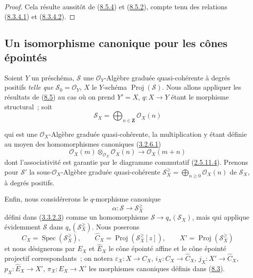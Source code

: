 \begin{proof}
Cela résulte aussitôt de (\hyperref[II.8.5.4-fr]{8.5.4}) et
(\hyperref[II.8.5.2-fr]{8.5.2}), compte tenu des relations
(\hyperref[II.8.3.4.1-fr]{8.3.4.1}) et
(\hyperref[II.8.3.4.2-fr]{8.3.4.2}).
\end{proof}

\subsection{Un isomorphisme canonique pour les cônes épointés}
\label{subsection:II.8.6-fr}

\begin{env}[8.6.1]
\label{II.8.6.1-fr}
Soient $Y$ un préschéma, $\mathcal{S}$ une $\mathcal{O}_Y$-Algèbre graduée
quasi-cohérente à degrés positifs \emph{telle que
$\mathcal{S}_0=\mathcal{O}_Y$}, $X$ le $Y$-schéma
$\operatorname{Proj}(\mathcal{S})$. Nous allons appliquer les résultats de
(\hyperref[subsection:II.8.5-fr]{8.5}) au cas où on prend $Y'=X$,
$q:X\to Y$ étant le morphisme structural~; soit
\begin{equation}
\label{II.8.6.1.1-fr}
  \mathcal{S}_X=\bigoplus_{n\in\mathbf{Z}}\mathcal{O}_X(n)
\tag{8.6.1.1}
\end{equation}

qui est une $\mathcal{O}_X$-Algèbre graduée quasi-cohérente, la multiplication
y étant définie au moyen des homomorphismes canoniques
(\hyperref[II.3.2.6.1-fr]{3.2.6.1})
\[
  \mathcal{O}_X(m)\otimes_{\mathcal{O}_X}\mathcal{O}_X(n)
  \to\mathcal{O}_X(m+n)
\]
dont l'associativité est garantie par le diagramme commutatif
(\hyperref[II.2.5.11.4-fr]{2.5.11.4}). Prenons pour $\mathcal{S}'$ la
sous-$\mathcal{O}_X$-Algèbre graduée quasi-cohérente
$\mathcal{S}_X^{\geq}=\bigoplus_{n\geq0}\mathcal{O}_X(n)$ de
$\mathcal{S}_X$, à degrés positifs.

Enfin, nous considérerons le $q$-morphisme canonique
\begin{equation}
\label{II.8.6.1.2-fr}
  \alpha:\mathcal{S}\to\mathcal{S}_X^{\geq}
\tag{8.6.1.2}
\end{equation}
défini dans (\hyperref[II.3.3.2.3-fr]{3.3.2.3}) comme un homomorphisme
$\mathcal{S}\to q_*(\mathcal{S}_X)$, mais qui applique évidemment
$\mathcal{S}$ dans $q_*(\mathcal{S}_X^{\geq})$. Nous poserons
\begin{equation}
\label{II.8.6.1.3-fr}
  C_X=\operatorname{Spec}(\mathcal{S}_X^{\geq}),\qquad
  \widehat{C}_X=\operatorname{Proj}(\mathcal{S}_X^{\geq}[z]),\qquad
  X'=\operatorname{Proj}(\mathcal{S}_X^{\geq})
\tag{8.6.1.3}
\end{equation}
et nous désignerons par $E_X$ et $\widehat{E}_X$ le cône épointé affine et le
cône épointé projectif correspondants~; on notera
$\varepsilon_X:X\to C_X$, $i_X:C_X\to\widehat{C}_X$,
$j_X:X'\to\widehat{C}_X$, $p_X:\widehat{E}_X\to X'$,
$\pi_X:E_X\to X'$ les morphismes canoniques définis dans
(\hyperref[subsection:II.8.3-fr]{8.3}).
\end{env}

